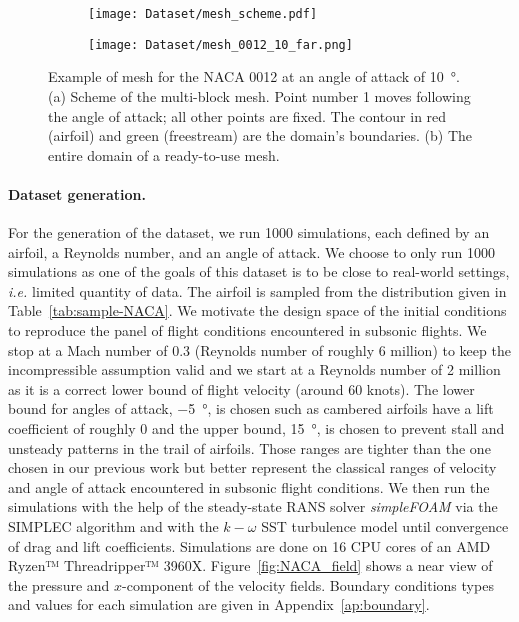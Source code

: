 \begin{figure}
	\centering
	\begin{subfigure}{0.49\textwidth}
		\centering
		\texttt{[image: Dataset/mesh\_scheme.pdf]}
		\caption{}
	\end{subfigure}
	\begin{subfigure}{0.49\textwidth}
		\centering
		\texttt{[image: Dataset/mesh\_0012\_10\_far.png]}
		\caption{}
	\end{subfigure}
	\caption[Example of mesh for the \acrshort{NACA} 0012 at an angle of attack of \SI{10}{\degree}.]{Example of mesh for the \acrshort{NACA} 0012 at an angle of attack of \SI{10}{\degree}. (a) Scheme of the multi-block mesh. Point number 1 moves following the angle of attack; all other points are fixed. The contour in red (airfoil) and green (freestream) are the domain's boundaries. (b) The entire domain of a ready-to-use mesh.}
	\label{fig:mesh_scheme}
\end{figure}

\paragraph{Dataset generation.} For the generation of the dataset, we run \SI{1000}{} simulations, each defined by an airfoil, a Reynolds number, and an angle of attack. We choose to only run \SI{1000}{} simulations as one of the goals of this dataset is to be close to real-world settings, \emph{i.e.} limited quantity of data. The airfoil is sampled from the distribution given in Table~\ref{tab:sample-NACA}. We motivate the design space of the initial conditions to reproduce the panel of flight conditions encountered in subsonic flights. We stop at a Mach number of 0.3 (Reynolds number of roughly 6 million) to keep the incompressible assumption valid and we start at a Reynolds number of 2 million as it is a correct lower bound of flight velocity (around 60 knots). The lower bound for angles of attack, \SI{-5}{\degree}, is chosen such as cambered airfoils have a lift coefficient of roughly 0 and the upper bound, \SI{15}{\degree}, is chosen to prevent stall and unsteady patterns in the trail of airfoils. Those ranges are tighter than the one chosen in our previous work \cite{bonnet2022an} but better represent the classical ranges of velocity and angle of attack encountered in subsonic flight conditions. We then run the simulations with the help of the steady-state \acrshort{RANS} solver \emph{simpleFOAM} via the SIMPLEC algorithm \cite{SIMPLE, SIMPLEC} and with the $k-\omega$ SST turbulence model \cite{SST} until convergence of drag and lift coefficients. Simulations are done on 16 CPU cores of an AMD Ryzen™ Threadripper™ 3960X. Figure~\ref{fig:NACA_field} shows a near view of the pressure and $x$-component of the velocity fields. Boundary conditions types and values for each simulation are given in Appendix~\ref{ap:boundary}.

